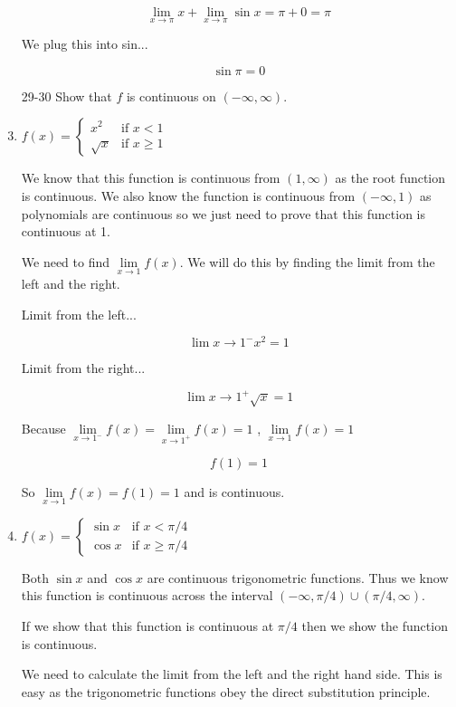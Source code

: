 \documentclass{article}
\begin{document}
\begin{enumerate}
			$$\lim \limits _{x \to \pi} x + \lim \limits _{x \to \pi} \sin x 
				= \pi + 0 = \pi$$

			We plug this into sin...
		
			$$\sin \pi = 0$$

			\item[29-30] Show that $f$ is continuous on $(-\infty, \infty)$.

			\item $f(x) = 
				\begin{cases}
					x^2 & \text{if } x < 1 \\
					\sqrt{x} & \text{if } x \geq 1
				\end{cases}$ 

				We know that this function is continuous from $(1, \infty)$ as the root
				function is continuous. We also know the function is continuous from
				$(-\infty, 1)$ as polynomials are continuous so we just need to prove that
				this function is continuous at 1.

				We need to find $\lim \limits _{x \to 1} f(x)$. We will do this by finding the
				limit from the left and the right.

				Limit from the left...

				$$\lim \limits {x \to 1^{-}} x^2 = 1$$
				

				Limit from the right...

				$$\lim \limits {x \to 1^{+}} \sqrt{x} = 1$$

				Because $\lim \limits _{x \to 1^{-}} f(x) = \lim \limits _{x \to 1^{+}} f(x) = 1$
				, $\lim \limits _{x \to 1} f(x) = 1$

				$$f(1) = 1$$

				So $\lim \limits _{x \to 1} f(x) = f(1) = 1$ and is continuous.

			\item $f(x) =
				\begin{cases}
					\sin x & \text{if } x < \pi/4 \\
					\cos x & \text{if } x \geq \pi/4
				\end{cases}$

				
				Both $\sin x$ and $\cos x$ are continuous trigonometric functions.
				Thus we know this function is continuous across the interval
				$(-\infty, \pi/4) \cup (\pi/4, \infty)$.

				If we show that this function is continuous at $\pi/4$ then we show
				the function is continuous.

				We need to calculate the limit from the left and the right hand side.
				This is easy as the trigonometric functions obey the direct substitution
				principle.


\end{enumerate}
\end{document}
